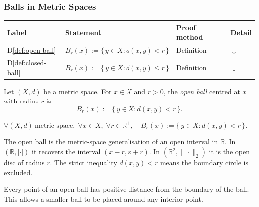 \subsubsection{Balls in Metric Spaces}
\label{sec:balls-metric-spaces}

\begin{tcolorbox}[colback=gray!6, colframe=gray!40, arc=2pt,
  left=6pt, right=6pt, top=4pt, bottom=4pt,
  title={\small\textbf{Balls in Metric Spaces --- Quick Reference}},
  fonttitle=\small\bfseries]
\small
\begin{tabular}{l l l l}
\toprule
\textbf{Label} & \textbf{Statement} & \textbf{Proof method} & \textbf{Detail} \\
\midrule
D\ref{def:open-ball}
  & $B_r(x) := \{\,y\in X : d(x,y) < r\,\}$
  & Definition
  & \hyperref[def:open-ball]{$\downarrow$} \\
D\ref{def:closed-ball}
  & $\overline{B}_r(x) := \{\,y\in X : d(x,y) \le r\,\}$
  & Definition
  & \hyperref[def:closed-ball]{$\downarrow$} \\
\bottomrule
\end{tabular}
\end{tcolorbox}

\begin{tcolorbox}[colback=propbox, colframe=propborder, arc=2pt,
  left=6pt, right=6pt, top=4pt, bottom=4pt,
  title={\small\textbf{Definition (Open Ball)}},
  fonttitle=\small\bfseries]
\begin{definition}
\label{def:open-ball}
Let $(X,d)$ be a metric space.
For $x \in X$ and $r > 0$, the \emph{open ball} centred at $x$ with radius $r$ is
\[
B_r(x)
:=
\{\, y \in X : d(x,y) < r \,\}.
\]
\end{definition}
\end{tcolorbox}

\begin{remark*}
$\forall (X,d)\ \text{metric space},\;
 \forall x \in X,\;
 \forall r \in \mathbb{R}^{+},\quad
 B_r(x) := \{\, y \in X : d(x,y) < r \,\}.$
\end{remark*}



\begin{remark*}[Intuition]
The open ball is the metric-space generalisation of an open interval in $\mathbb{R}$.
In $(\mathbb{R}, |\cdot|)$ it recovers the interval $(x-r, x+r)$.
In $(\mathbb{R}^2, \|\cdot\|_2)$ it is the open disc of radius $r$.
The strict inequality $d(x,y) < r$ means the boundary circle is excluded.
\end{remark*}
\begin{remark*}
Every point of an open ball has positive distance from the boundary of the ball.
This allows a smaller ball to be placed around any interior point.
\end{remark*}

